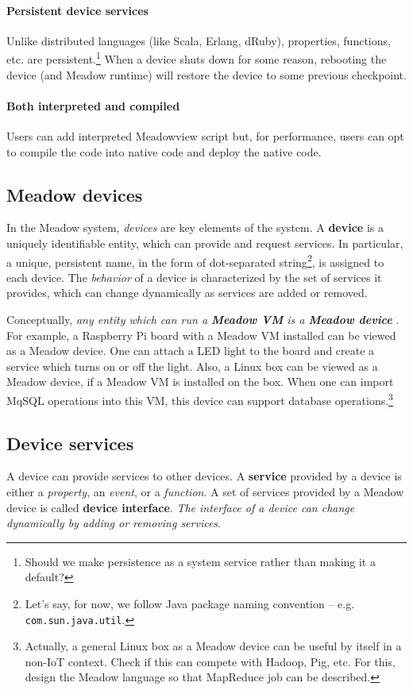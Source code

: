 \documentclass{note}
\begin{document}
\paragraph{Persistent device services}
Unlike distributed languages (like Scala, Erlang, dRuby), properties,
   functions, etc. are persistent.\footnote{\textcolor{green2}{Should we make
       persistence as a system service rather than making it a default?}} 
   When a device shuts down for some reason, rebooting the device (and Meadow
   runtime) will restore the device to some previous checkpoint.

\paragraph{Both interpreted and compiled}
Users can add interpreted Meadowview script
but, for performance, users can opt to compile the code into native code and 
deploy the native code.

\subsection{Meadow devices}
In the Meadow system, {\em devices\/} are key elements of the
system. A \textcolor{blue2}{\bf{}device} is a uniquely identifiable entity,
which can provide and request services. 
In particular, a unique, persistent name, in the form of dot-separated
string\footnote{Let's say, for now, we follow Java package naming convention
  -- e.g. \texttt{com.sun.java.util}.},
is assigned to each device. The {\em behavior\/} of a device is characterized
by the set of services it provides, which can change dynamically as
services are added or removed. 

Conceptually, \textcolor{blue2}{\em any entity which can run a
  \textcolor{blue2}{\bf{}\em Meadow VM} is a {\bf\em Meadow device} \/}. 
For example, a Raspberry Pi board with a Meadow VM installed can be viewed as a
Meadow device. One can attach a LED light to the board and create a service 
which turns on or off the light.
Also, a Linux box can be viewed as a Meadow
device, if a Meadow VM is installed on the box.
When one can import MqSQL operations into this VM, this device can support
database operations.\footnote{\textcolor{green2}{Actually, a general Linux box
    as a Meadow device can be useful by itself in a non-IoT context. 
    Check if this can
    compete with Hadoop, Pig, etc. For this, design the Meadow language so that
    MapReduce job can be described.}}

\subsection{Device services}
A device can provide services to other devices. 
A \textcolor{blue2}{\bf{}service} provided by a device is either a
{\em property}, an {\em event\/}, or a {\em function\/}. 
A set of services provided by a Meadow device is called
\textcolor{blue2}{\bf{}device interface}. 
\textcolor{blue2}{\em The interface of a device can change
dynamically by adding or removing services\/}.
\end{document}
